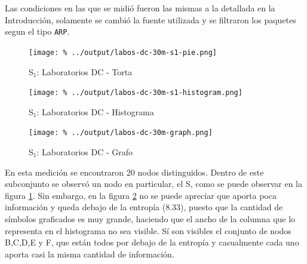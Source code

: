 \documentclass[final,inline,a4paper,narroweqnarray]{ieee}
\begin{document}
  Las condiciones en las que se midió fueron las mismas a la detallada
  en la Introducción, solamente se cambió la fuente utilizada y se
  filtraron los paquetes segun el tipo \texttt{ARP}.

    \begin{figure}[ht]\begin{center}
      \texttt{[image: \%
      ../output/labos-dc-30m-s1-pie.png]}
      \vspace{-2em}
      \caption{S$_1$: Laboratorios DC - Torta}
      \label{labos-dc-30m-s1-pie}
    \end{center}\end{figure}

    \begin{figure}[ht]\begin{center}
      \texttt{[image: \%
      ../output/labos-dc-30m-s1-histogram.png]}
      \caption{S$_1$: Laboratorios DC - Histograma}
      \label{labos-dc-30m-s1-histogram}
    \end{center}\end{figure}
   
    \begin{figure}[ht]\begin{center}
      \texttt{[image: \%
      ../output/labos-dc-30m-graph.png]}
      \caption{S$_1$: Laboratorios DC - Grafo}
      \label{labos-dc-30m-graph}
    \end{center}\end{figure}
  
  En esta medición se encontraron 20 nodos distinguidos. Dentro de este 
  subconjunto se observó un nodo en particular, el S, como se puede observar 
  en la figura \ref{labos-dc-30m-s1-pie}. Sin embargo, en la figura 
  \ref{labos-dc-30m-s1-histogram} no se puede apreciar que aporta poca
  información y queda debajo de la entropía (8.33), puesto que la cantidad de
  símbolos graficados es muy grande, haciendo que el ancho de la columna que
  lo representa en el histograma no sea visible. Sí son visibles el conjunto
  de nodos B,C,D,E y F, que están todos por debajo de la entropía y casualmente
  cada uno aporta casi la misma cantidad de información. 
\end{document}
